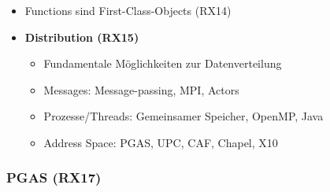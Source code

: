 \begin{itemize}
	\item Functions sind First-Class-Objects (RX14)
	\item \textbf{Distribution (RX15)}
	\begin{itemize}
		\item Fundamentale Möglichkeiten zur Datenverteilung
		\item Messages: Message-passing, MPI, Actors
		\item Prozesse/Threads: Gemeinsamer Speicher, OpenMP, Java
		\item Address Space: PGAS, UPC, CAF, Chapel, X10
	\end{itemize}
\end{itemize}

\subsubsection{PGAS (RX17)}
